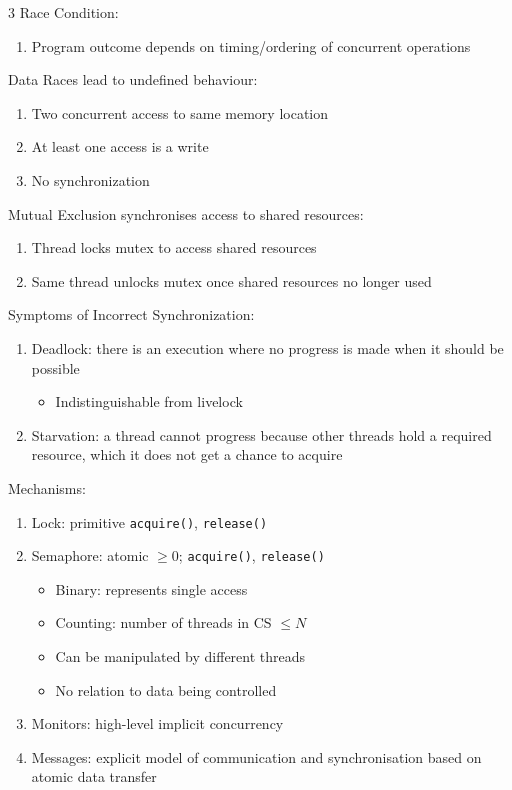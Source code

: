\documentclass[12pt, a4paper]{article}
\begin{document}
\begin{multicols*}{3}
Race Condition:
\begin{enumerate}[\roman*.]
  \item Program outcome depends on timing/ordering of concurrent operations
\end{enumerate}

Data Races lead to undefined behaviour:
\begin{enumerate}[\roman*.]
  \item Two concurrent access to same memory location
  \item At least one access is a write
  \item No synchronization
\end{enumerate}

Mutual Exclusion synchronises access to shared resources:
\begin{enumerate}[\roman*.]
  \item Thread locks mutex to access shared resources 
  \item Same thread unlocks mutex once shared resources no longer used
\end{enumerate}

Symptoms of Incorrect Synchronization:
\begin{enumerate}[\roman*.]
  \item Deadlock: there is an execution where no progress is made when it should be possible 
    \begin{itemize}[leftmargin=*]\vspace{3pt}
      \item Indistinguishable from livelock 
    \end{itemize}
  \item Starvation: a thread cannot progress because other threads hold a required resource, which it does not get a chance to acquire
\end{enumerate}

\lstset{style=c}
Mechanisms:
\begin{enumerate}[\roman*.]
  \item Lock: primitive \lstinline|acquire()|, \lstinline|release()|
  \item Semaphore: atomic $\geq 0$; \lstinline|acquire()|, \lstinline|release()|   
    \begin{itemize}[leftmargin=*]\vspace{3pt}
      \item Binary: represents single access 
      \item Counting: number of threads in CS $\leq N$
      \item Can be manipulated by different threads 
      \item No relation to data being controlled
    \end{itemize}
  \item Monitors: high-level implicit concurrency
  \item Messages: explicit model of communication and synchronisation based on atomic data transfer
\end{enumerate}
\vspace{-1em}
\colbreak

\end{multicols*}
\end{document}
